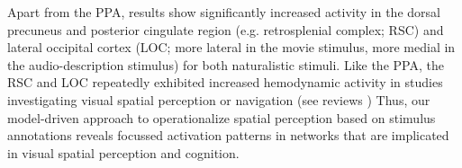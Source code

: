 \documentclass[english,11pt]{article}
\begin{document}

Apart from the PPA, results show significantly increased activity in the dorsal
precuneus and posterior cingulate region (e.g. retrosplenial complex; RSC) and
lateral occipital cortex (LOC; more lateral in the movie stimulus, more medial
in the audio-description stimulus) for both naturalistic stimuli.
Like the PPA, the RSC and LOC repeatedly exhibited increased hemodynamic
activity in studies investigating visual spatial perception or navigation (see reviews
\citep{chrastil2018heterogeneity, bettencourt2013role, epstein2019scene})
Thus, our model-driven approach to operationalize spatial perception based on
stimulus annotations reveals focussed activation patterns in networks that are
implicated in visual spatial perception and cognition.

\end{document}
